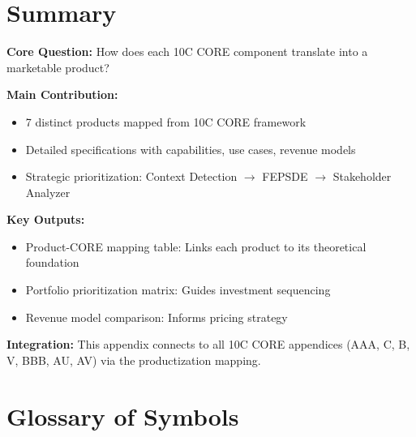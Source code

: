 
\section{Summary}
\label{sec:vvv3-summary}

\begin{tcolorbox}[colback=green!10!white, colframe=green!75!black,
    title=\textbf{Appendix VVV.3: Summary}]

\textbf{Core Question:} How does each 10C CORE component translate into a marketable product?

\textbf{Main Contribution:}
\begin{itemize}[nosep]
    \item 7 distinct products mapped from 10C CORE framework
    \item Detailed specifications with capabilities, use cases, revenue models
    \item Strategic prioritization: Context Detection $\to$ FEPSDE $\to$ Stakeholder Analyzer
\end{itemize}

\textbf{Key Outputs:}
\begin{itemize}[nosep]
    \item Product-CORE mapping table: Links each product to its theoretical foundation
    \item Portfolio prioritization matrix: Guides investment sequencing
    \item Revenue model comparison: Informs pricing strategy
\end{itemize}

\textbf{Integration:} This appendix connects to all 10C CORE appendices (AAA, C, B, V, BBB, AU, AV) via the productization mapping.

\end{tcolorbox}


\section{Glossary of Symbols}
\label{sec:vvv3-glossary}

